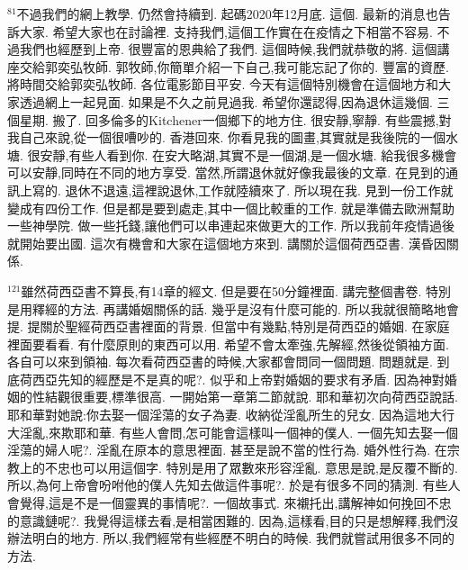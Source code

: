 \documentclass{book}
\begin{document}
$^{81}$不過我們的網上教學.
仍然會持續到.
起碼2020年12月底.
這個.
最新的消息也告訴大家.
希望大家也在討論裡.
支持我們,這個工作實在在疫情之下相當不容易.
不過我們也經歷到上帝.
很豐富的恩典給了我們.
這個時候,我們就恭敬的將.
這個講座交給郭奕弘牧師.
郭牧師,你簡單介紹一下自己,我可能忘記了你的.
豐富的資歷.
將時間交給郭奕弘牧師.
各位電影節目平安.
今天有這個特別機會在這個地方和大家透過網上一起見面.
如果是不久之前見過我.
希望你還認得,因為退休這幾個.
三個星期.
搬了.
回多倫多的Kitchener一個鄉下的地方住.
很安靜,寧靜.
有些震撼,對我自己來說,從一個很嘈吵的.
香港回來.
你看見我的圖畫,其實就是我後院的一個水塘.
很安靜,有些人看到你.
在安大略湖,其實不是一個湖,是一個水塘.
給我很多機會可以安靜,同時在不同的地方享受.
當然,所謂退休就好像我最後的文章.
在見到的通訊上寫的.
退休不退遠,這裡說退休,工作就陸續來了.
所以現在我.
見到一份工作就變成有四份工作.
但是都是要到處走,其中一個比較重的工作.
就是準備去歐洲幫助一些神學院.
做一些托錢,讓他們可以串連起來做更大的工作.
所以我前年疫情過後就開始要出國.
這次有機會和大家在這個地方來到.
講關於這個荷西亞書.
漢昏因關係.

$^{121}$雖然荷西亞書不算長,有14章的經文.
但是要在50分鐘裡面.
講完整個書卷.
特別是用釋經的方法.
再講婚姻關係的話.
幾乎是沒有什麼可能的.
所以我就很簡略地會提.
提關於聖經荷西亞書裡面的背景.
但當中有幾點,特別是荷西亞的婚姻.
在家庭裡面要看看.
有什麼原則的東西可以用.
希望不會太牽強,先解經,然後從領袖方面.
各自可以來到領袖.
每次看荷西亞書的時候,大家都會問同一個問題.
問題就是.
到底荷西亞先知的經歷是不是真的呢?.
似乎和上帝對婚姻的要求有矛盾.
因為神對婚姻的性結觀很重要,標準很高.
一開始第一章第二節就說.
耶和華初次向荷西亞說話.
耶和華對她說:你去娶一個淫蕩的女子為妻.
收納從淫亂所生的兒女.
因為這地大行大淫亂,來欺耶和華.
有些人會問,怎可能會這樣叫一個神的僕人.
一個先知去娶一個淫蕩的婦人呢?.
淫亂在原本的意思裡面.
甚至是說不當的性行為.
婚外性行為.
在宗教上的不忠也可以用這個字.
特別是用了眾數來形容淫亂.
意思是說,是反覆不斷的.
所以,為何上帝會吩咐他的僕人先知去做這件事呢?.
於是有很多不同的猜測.
有些人會覺得,這是不是一個靈異的事情呢?.
一個故事式.
來襯托出,講解神如何挽回不忠的意識鏈呢?.
我覺得這樣去看,是相當困難的.
因為,這樣看,目的只是想解釋,我們沒辦法明白的地方.
所以,我們經常有些經歷不明白的時候.
我們就嘗試用很多不同的方法.
\end{document}
